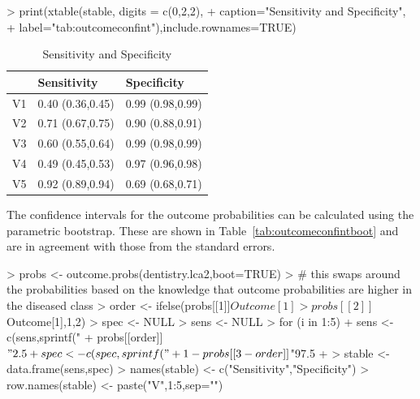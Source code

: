 \begin{Schunk}
\begin{Sinput}
> print(xtable(stable, digits = c(0,2,2),
+ 	caption="Sensitivity and Specificity",
+ 	label="tab:outcomeconfint"),include.rownames=TRUE)
\end{Sinput}
\begin{table}[ht]
\centering
\begin{tabular}{rll}
  \hline
 & Sensitivity & Specificity \\ 
  \hline
V1 & 0.40 (0.36,0.45) & 0.99 (0.98,0.99) \\ 
  V2 & 0.71 (0.67,0.75) & 0.90 (0.88,0.91) \\ 
  V3 & 0.60 (0.55,0.64) & 0.99 (0.98,0.99) \\ 
  V4 & 0.49 (0.45,0.53) & 0.97 (0.96,0.98) \\ 
  V5 & 0.92 (0.89,0.94) & 0.69 (0.68,0.71) \\ 
   \hline
\end{tabular}
\caption{Sensitivity and Specificity} 
\label{tab:outcomeconfint}
\end{table}\end{Schunk}


The confidence intervals for the outcome probabilities can be calculated using the parametric bootstrap. These are shown in Table~\ref{tab:outcomeconfintboot} and are in agreement with those from the standard errors.


\begin{Schunk}
\begin{Sinput}
> probs <- outcome.probs(dentistry.lca2,boot=TRUE)
> # this swaps around the probabilities based on the knowledge that outcome probabilities are higher in the diseased class
> order <- ifelse(probs[[1]]$Outcome[1]>probs[[2]]$Outcome[1],1,2)
> spec <- NULL
> sens <- NULL
> for (i in 1:5) {
+ 	sens <- c(sens,sprintf("%
+       probs[[order]]$"2.5 %
+ 	spec <- c(spec,sprintf("%
+       1-probs[[3-order]]$"97.5 %
+ }
> stable <- data.frame(sens,spec)
> names(stable) <- c("Sensitivity","Specificity")
> row.names(stable) <- paste("V",1:5,sep="")
\end{Sinput}
\end{Schunk}

